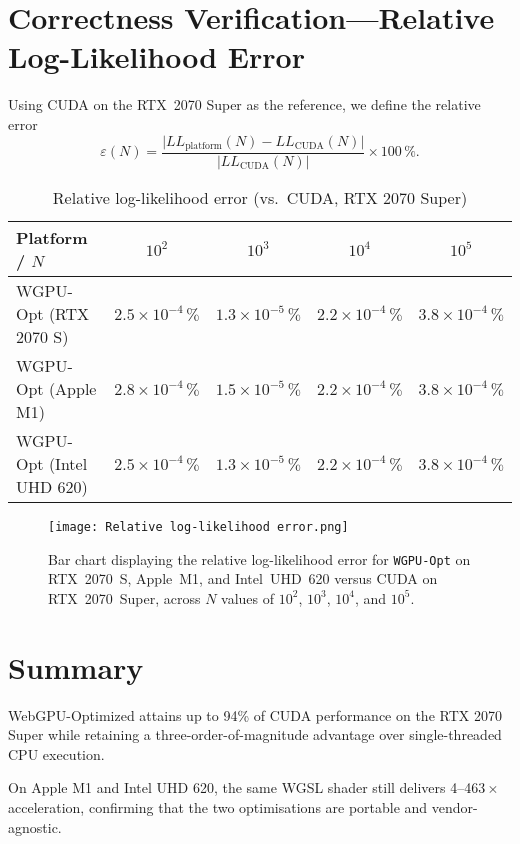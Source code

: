 \documentclass[PhD]{PHlab-thesis}
\begin{document}
\section{Correctness Verification—Relative Log-Likelihood Error}
Using CUDA on the RTX~2070 Super as the reference, we define the relative error
\[
  \varepsilon(N)=
  \frac{\lvert LL_{\text{platform}}(N)-LL_{\text{CUDA}}(N)\rvert}
       {\lvert LL_{\text{CUDA}}(N)\rvert}\times100\,\%.
\]

\begin{table}[h]
  \centering
  \caption{Relative log-likelihood error (vs.\ CUDA, RTX 2070 Super)}
  \label{tab:likelihood_error}
  \setlength{\tabcolsep}{6pt}
  \renewcommand{\arraystretch}{1.9}
  \small
  \begin{tabularx}{\textwidth}{@{}X c c c c@{}}
    \toprule
    Platform / $N$      & $10^{2}$ & $10^{3}$ & $10^{4}$ & $10^{5}$ \\
    \midrule
    WGPU-Opt (RTX 2070 S)  & $2.5\times10^{-4}\,\%$ & $1.3\times10^{-5}\,\%$ & $2.2\times10^{-4}\,\%$ & $3.8\times10^{-4}\,\%$ \\
    WGPU-Opt (Apple M1)    & $2.8\times10^{-4}\,\%$ & $1.5\times10^{-5}\,\%$ & $2.2\times10^{-4}\,\%$ & $3.8\times10^{-4}\,\%$ \\
    WGPU-Opt (Intel UHD 620)& $2.5\times10^{-4}\,\%$ & $1.3\times10^{-5}\,\%$ & $2.2\times10^{-4}\,\%$ & $3.8\times10^{-4}\,\%$ \\
    \bottomrule
  \end{tabularx}
\end{table}
\newpage
\begin{figure}
    \centering
    \texttt{[image: Relative log-likelihood error.png]}
    \caption{Bar chart displaying the relative log-likelihood error for \texttt{WGPU-Opt} on RTX~2070~S, Apple~M1, and Intel~UHD~620 versus CUDA on RTX~2070~Super, across $N$ values of $10^2$, $10^3$, $10^4$, and $10^5$.}
    \label{log-likelihood error}
\end{figure}


\section{Summary}
WebGPU-Optimized attains up to 94\% of CUDA performance on the RTX 2070 Super while retaining a three-order-of-magnitude advantage over single-threaded CPU execution.  

On Apple M1 and Intel UHD 620, the same WGSL shader still delivers 4–463\,$\times$ acceleration, confirming that the two optimisations are portable and vendor-agnostic.  
\end{document}
